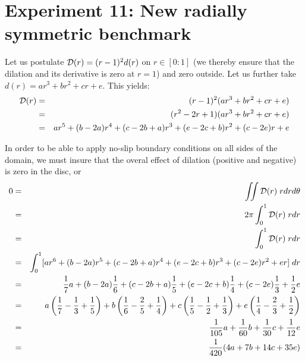 \newpage
\section*{Experiment 11: New radially symmetric benchmark}





Let us postulate ${\cal D}(r)=(r-1)^2 d(r)$ on $r\in [0:1]$ (we thereby ensure that the dilation 
and its derivative is zero at $r=1$) and zero outside. Let us further take $d(r)=ar^3+br^2+cr+e$.
This yields:
\begin{eqnarray}
{\cal D}(r)
&=&(r-1)^2 (ar^3+br^2+cr+e) \nonumber\\
&=&(r^2-2r+1) (ar^3+br^2+cr+e) \nonumber\\
&=& ar^5 +(b-2a) r^4+(c-2b+a)r^3+(e-2c+b)r^2 +(c-2e)r + e
\end{eqnarray}


In order to be able to apply no-slip boundary conditions on all sides of the domain, 
we must insure that the overal effect of dilation (positive and negative) is zero 
in the disc, or
\begin{eqnarray}
0 &=& \iint {\cal D}(r) \; r dr d\theta \nonumber\\ 
&=& 2 \pi \int_0^1 {\cal D}(r) \; r dr \nonumber\\
&=& \int_0^1 {\cal D}(r) \; r dr  \nonumber\\
&=& \int_0^1 [ ar^6 +(b-2a) r^5+(c-2b+a)r^4+(e-2c+b)r^3 +(c-2e)r^2 + er ] \;  dr  \nonumber\\
&=& \frac17 a +(b-2a)\frac16 +(c-2b+a) \frac15 +(e-2c+b) \frac14  +  (c-2e) \frac13  +\frac12 e   \nonumber\\
&=& 
a \left( \frac17 - \frac13 +\frac15 \right) +
b \left( \frac16 -\frac25 +\frac14  \right) +
c \left( \frac15 -\frac12 +\frac13  \right) +
e \left( \frac14 -\frac23 +\frac12 \right) \nonumber\\
&=& \frac{1}{105}a
+\frac{1}{60} b
+ \frac{1}{30} c
+\frac{1}{12}e \nonumber\\
&=& \frac{1}{420} (4a +7b +14c +35e) \label{eq:420} 
\end{eqnarray}






